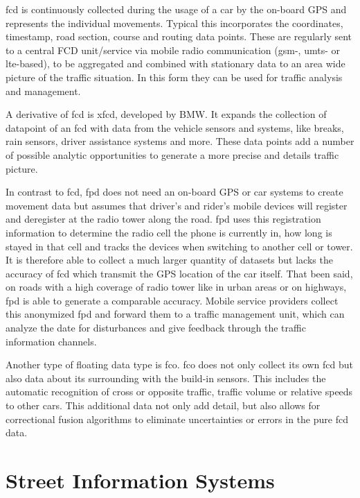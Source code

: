 \documentclass[a4paper,12pt]{report}
\begin{document}
\acrfull{fcd} is continuously collected during the usage of a car by the on-board GPS and represents the individual movements. Typical this incorporates the coordinates, timestamp, road section, course and routing data points. These are regularly sent to a central FCD unit/service via mobile radio communication (\acrshort{gsm}-, \acrshort{umts}- or \acrshort{lte}-based), to be aggregated and combined with stationary data to an area wide picture of the traffic situation. In this form they can be used for traffic analysis and management. \cite{Randelhoff2016,LAPID2020}

A derivative of \acrshort{fcd} is \acrfull{xfcd}, developed by BMW. It expands the collection of datapoint of an \acrshort{fcd} with data from the vehicle sensors and systems, like breaks, rain sensors, driver assistance systems and more. These data points add a number of possible analytic opportunities to generate a more precise and details traffic picture. \cite{LAPID2020}

In contrast to \acrshort{fcd}, \acrlong{fpd} does not need an on-board GPS or car systems to create movement data but assumes that driver’s and rider’s mobile devices will register and deregister at the radio tower along the road. \acrshort{fpd} uses this registration information to determine the radio cell the phone is currently in, how long is stayed in that cell and tracks the devices when switching to another cell or tower. It is therefore able to collect a much larger quantity of datasets but lacks the accuracy of \acrshort{fcd} which transmit the GPS location of the car itself. That been said, on roads with a high coverage of radio tower like in urban areas or on highways, \acrshort{fpd} is able to generate a comparable accuracy. Mobile service providers collect this anonymized \acrshort{fpd} and forward them to a traffic management unit, which can analyze the date for disturbances and give feedback through the traffic information channels. \cite{Randelhoff2016,LAPID2020}

Another type of floating data type is \acrfull{fco}. \acrshort{fco} does not only collect its own \acrshort{fcd} but also data about its surrounding with the build-in sensors. This includes the automatic recognition of cross or opposite traffic, traffic volume or relative speeds to other cars. This additional data not only add detail, but also allows for correctional fusion algorithms to eliminate uncertainties or errors in the pure \acrshort{fcd} data. \cite{Randelhoff2016}

\section{Street Information Systems}
\end{document}

